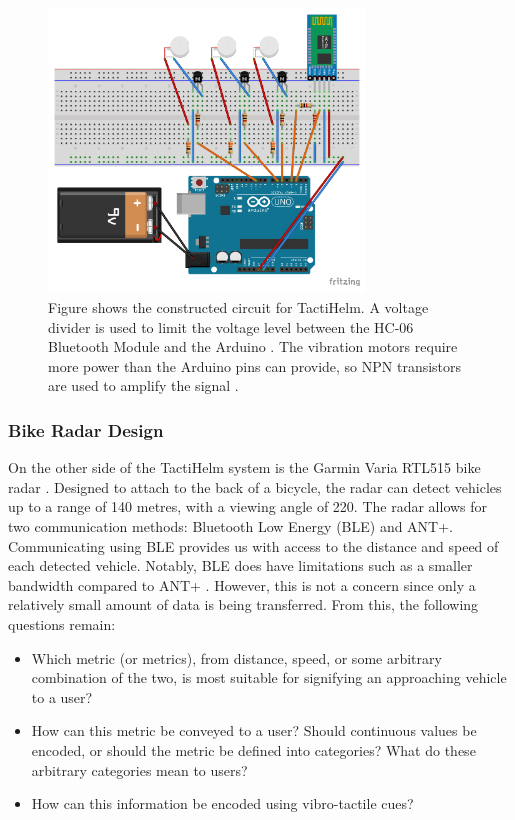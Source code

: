 \documentclass{interim}
\begin{document}
\begin{figure}[!ht]
    \centering
    \includegraphics[width=0.75\textwidth]{images/circuit-design_bb.pdf}
    \caption{Figure shows the constructed circuit for TactiHelm. A voltage divider is used to limit the voltage level between the HC-06 Bluetooth Module and the Arduino \cite{bluetoothmodule}. The vibration motors require more power than the Arduino pins can provide, so NPN transistors are used to amplify the signal \cite{vibrationmotor}.}
    \label{fig:circuit}
\end{figure}


\subsubsection{Bike Radar Design}
On the other side of the TactiHelm system is the Garmin Varia RTL515 bike radar \cite{garminradar}. Designed to attach to the back of a bicycle, the radar can detect vehicles up to a range of 140 metres, with a viewing angle of 220\degree{}. The radar allows for two communication methods: Bluetooth Low Energy (BLE) and ANT+. Communicating using BLE provides us with access to the distance and speed of each detected vehicle. Notably, BLE does have limitations such as a smaller bandwidth compared to ANT+ \cite{bluetoothlimitations}. However, this is not a concern since only a relatively small amount of data is being transferred. From this, the following questions remain:
\begin{itemize}
    \item Which metric (or metrics), from distance, speed, or some arbitrary combination of the two, is most suitable for signifying an approaching vehicle to a user?
    \item How can this metric be conveyed to a user? Should continuous values be encoded, or should the metric be defined into categories? What do these arbitrary categories mean to users? 
    \item How can this information be encoded using vibro-tactile cues?
\end{itemize}
\end{document}
